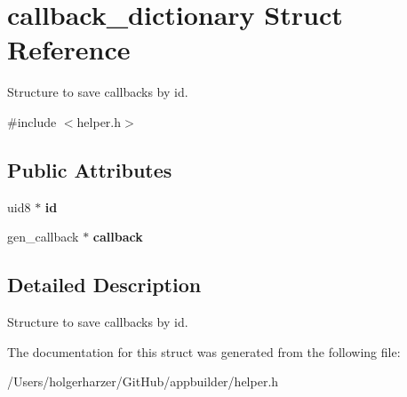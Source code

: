 \hypertarget{structcallback__dictionary}{\section{callback\+\_\+dictionary Struct Reference}
\label{structcallback__dictionary}
}


Structure to save callbacks by id.  




{\ttfamily \#include $<$helper.\+h$>$}

\subsection*{Public Attributes}
\begin{DoxyCompactItemize}
\item 
\hypertarget{structcallback__dictionary_a187a4d00861c73b3b963f4d2aee346a5}{uid8 $\ast$ {\bfseries id}}\label{structcallback__dictionary_a187a4d00861c73b3b963f4d2aee346a5}

\item 
\hypertarget{structcallback__dictionary_ae5bf2254961e10c73b9ef12dbab36440}{gen\+\_\+callback $\ast$ {\bfseries callback}}\label{structcallback__dictionary_ae5bf2254961e10c73b9ef12dbab36440}

\end{DoxyCompactItemize}


\subsection{Detailed Description}
Structure to save callbacks by id. 

The documentation for this struct was generated from the following file\+:\begin{DoxyCompactItemize}
\item 
/\+Users/holgerharzer/\+Git\+Hub/appbuilder/helper.\+h\end{DoxyCompactItemize}
